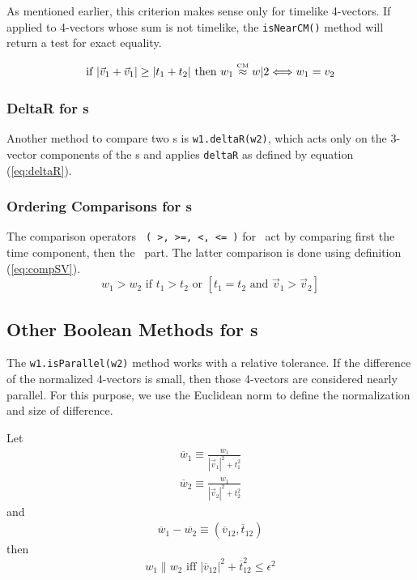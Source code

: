 As mentioned earlier, this criterion makes sense only for timelike 4-vectors.
If applied to 4-vectors whose sum is not timelike, the {\tt isNearCM()}
method will return a test for exact equality.

\begin{eqnarray}
\label{eq:wisNearCM:2}
  \mbox{if  } | \vec{v}_1 + \vec{v}_1 | \geq | t_1 + t_2 | \mbox{ then  }
w_1 \stackrel{\mbox{\tiny CM}}{\approx} w|2 \Longleftrightarrow w_1 = v_2
\end{eqnarray}

\subsubsection{DeltaR for \protect\LV s}
Another method to compare two \LV s is {\tt w1.deltaR(w2)}, which acts only
on the 3-vector components of the \LV s and applies {\tt deltaR} as defined
by equation (\ref{eq:deltaR}).

\subsubsection{Ordering Comparisons for \protect\LV s}

The comparison operators \verb$ ( >, >=, <, <= )$ for \LV\ act by comparing
first the time component, then the \SV\ part. The latter comparison is done
using definition (\ref{eq:compSV}).
\begin{equation}
\label{eq:wcomp}
  w_1 > w_2 \mbox{ if }
	t_1 > t_2 \mbox { or } \left[
	t_1 = t_2 \mbox { and }
	\vec{v}_1 > \vec{v}_2 \right]
\end{equation}

\subsection{Other Boolean Methods for \protect\LV s}

The {\tt w1.isParallel(w2)} method works with a relative tolerance.
If the difference of the normalized 4-vectors is small,
then those 4-vectors are considered nearly parallel.
For this purpose, we use the Euclidean norm to define the normalization and
size of difference.

Let
\begin{eqnarray}
  \overline{w}_1 \equiv \frac{w_1}{|\vec{v}_1|^2 + t_1^2} \nonumber \\
  \overline{w}_2 \equiv \frac{w_1}{|\vec{v}_2|^2 + t_2^2} \nonumber
\end{eqnarray}
\noindent
and
\begin{eqnarray}
  \overline{w}_1 - \overline{w_2} \equiv
  ( \overline{v}_{12} , \overline{t}_{12} ) \nonumber
\end{eqnarray}
\noindent
then
\begin{equation}
\label{eq:wisPar}
  w_1 \parallel w_2 \mbox{ iff }
  \left| \overline{v}_{12} \right| ^2 + \overline{t}_{12}^2 \leq \epsilon^2
\end{equation}

